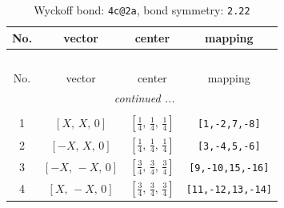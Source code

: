 \documentclass[fleqn,8pt]{jsarticle}
\begin{document}
\renewcommand{\arraystretch}{1.2}
\begin{longtable}{cccc}
\caption{Wyckoff bond: {\tt 4c@2a}, bond symmetry: {\tt 2.22}}
 \\
 \hline \hline
No. & vector & center & mapping \\ \hline \endfirsthead

\multicolumn{3}{l}{\tablename\ \thetable{}} \\
 \hline \hline
No. & vector & center & mapping \\ \hline \endhead

 \hline \hline
\multicolumn{3}{r}{\footnotesize\it continued ...} \\ \endfoot

 \hline \hline
\multicolumn{3}{r}{} \\ \endlastfoot

1 & $\left[ X,\, X,\, 0 \right]$ & $\left[ \frac{1}{4},\, \frac{1}{4},\, \frac{1}{4} \right]$ & {\tt [1,-2,7,-8]} \\ \hline
2 & $\left[ - X,\, X,\, 0 \right]$ & $\left[ \frac{1}{4},\, \frac{1}{4},\, \frac{1}{4} \right]$ & {\tt [3,-4,5,-6]} \\ \hline
3 & $\left[ - X,\, - X,\, 0 \right]$ & $\left[ \frac{3}{4},\, \frac{3}{4},\, \frac{3}{4} \right]$ & {\tt [9,-10,15,-16]} \\ \hline
4 & $\left[ X,\, - X,\, 0 \right]$ & $\left[ \frac{3}{4},\, \frac{3}{4},\, \frac{3}{4} \right]$ & {\tt [11,-12,13,-14]} \\
\end{longtable}
\renewcommand{\arraystretch}{1.2}
\end{document}
